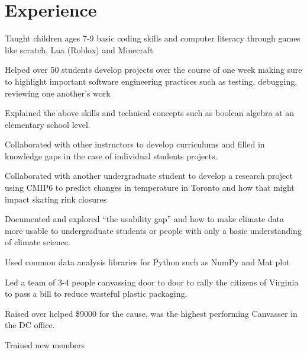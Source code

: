 \documentclass[letterpaper,10pt]{article}
\begin{document}

    \section{Experience}
    \begin{resume_list}
        \item Taught children ages 7-9 basic coding skills and computer literacy through games like scratch, Lua (Roblox) and Minecraft
        \item Helped over 50 students develop projects over the course of one week making sure to highlight important software engineering practices
        such as testing, debugging, reviewing one another's work
        \item Explained the above skills and technical concepts such as boolean algebra at an elementary school level.
        \item Collaborated with other instructors to develop curriculums and filled in knowledge gaps in the case of individual students projects.
    \end{resume_list}

    \begin{resume_list}
        \item Collaborated with another undergraduate student to develop a research project using CMIP6 to predict changes in temperature in Toronto and how that might impact
        skating rink closures
        \item Documented and explored ``the usability gap'' and how to make climate data more usable to undergraduate students or people with only a basic understanding of climate science.
        \item Used common data analysis libraries for Python such as NumPy and Mat plot
    \end{resume_list}
    \begin{resume_list}
        \item Led a team of 3-4 people canvassing door to door to rally the citizens of Virginia to pass a bill to reduce wasteful plastic packaging.
        \item Raised over helped \$9000 for the cause, was the highest performing Canvasser in the DC office.
        \item Trained new members
    \end{resume_list}
\end{document}
